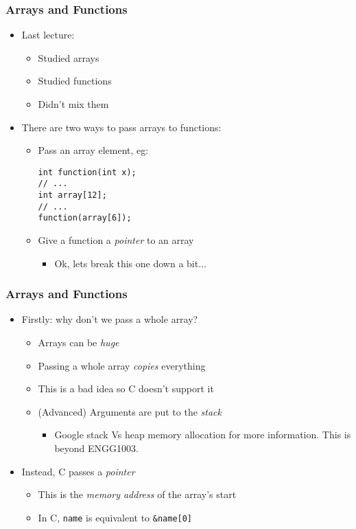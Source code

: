 \documentclass[14pt]{beamer}
\begin{document}
\begin{frame}[fragile]
\frametitle{Arrays and Functions}
\begin{itemize}
\item Last lecture:
	\begin{itemize}
		\item Studied arrays
		\item Studied functions
		\item Didn't mix them
	\end{itemize}
\pause
\item There are two ways to pass arrays to functions:
\vspace{-5mm}
	\begin{itemize}
	\pause
		\item Pass an array element, eg:
		\begin{lstlisting}[style=CStyle]
int function(int x);
// ...
int array[12];
// ...
function(array[6]);
\end{lstlisting}
\pause
		\item Give a function a \textit{pointer} to an array
			\begin{itemize}
				\item Ok, lets break this one down a bit...
			\end{itemize}
	\end{itemize}
\end{itemize}
\end{frame}

\begin{frame}
\frametitle{Arrays and Functions}
\begin{itemize}
\item Firstly: why don't we pass a whole array?
\pause
	\begin{itemize}
		\item Arrays can be \textit{huge}
		\item Passing a whole array \textit{copies} everything
		\item This is a bad idea so C doesn't support it
		\item (Advanced) Arguments are put to the \textit{stack}
			\begin{itemize}
				\item Google stack Vs heap memory allocation for more information. This is beyond ENGG1003.
			\end{itemize}
	\end{itemize}
\pause
\item Instead, C passes a \textit{pointer}
	\begin{itemize}
		\item This is the \textit{memory address} of the array's start
		\pause
		\item In C, \texttt{name} is equivalent to \texttt{\&name[0]}
	\end{itemize}
\end{itemize}
\end{frame}
\end{document}
